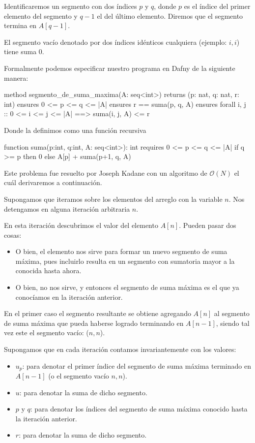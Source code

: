 \documentclass[12pt, a4paper, openany, fleqn]{book}
\begin{document}
    Identificaremos un segmento con dos índices $p$ y $q$, donde $p$ es el índice del primer elemento del segmento y $q-1$ el del último elemento. Diremos que el segmento termina en $A[q-1]$.

    El segmento vacío denotado por dos índices idénticos cualquiera (ejemplo: $i,i$) tiene suma 0.

    Formalmente podemos especificar nuestro programa en Dafny de la siguiente manera:

    \begin{dafny}
    method segmento_de_suma_maxima(A: seq<int>)
        returns (p: nat, q: nat, r: int)
        ensures 0 <= p <= q <= |A|
        ensures r == suma(p, q, A)
        ensures forall i, j :: 0 <= i <= j <= |A| ==> suma(i, j, A) <= r
    {
    }
    \end{dafny}

    Donde  la definimos como una función recursiva

    \begin{dafny}
    function suma(p:int, q:int, A: seq<int>): int
        requires 0 <= p <= q <= |A|
    {
        if q >= p then 0 else A[p] + suma(p+1, q, A)
    }
    \end{dafny}

    Este problema fue resuelto por Joseph Kadane con un algoritmo de $\mathcal{O}(N)$ el cuál derivaremos a continuación.

    Supongamos que iteramos sobre los elementos del arreglo con la variable $n$. Nos detengamos en alguna iteración arbitraria $n$.

    En esta iteración descubrimos el valor del elemento $A[n]$. Pueden pasar dos cosas:
    \begin{itemize}
        \item O bien, el elemento nos sirve para formar un nuevo segmento de suma máxima, pues incluirlo resulta en un segmento con sumatoria mayor a la conocida hasta ahora.
        \item O bien, no nos sirve, y entonces el segmento de suma máxima es el que ya conocíamos en la iteración anterior.
    \end{itemize}

    En el primer caso el segmento resultante se obtiene agregando $A[n]$ al segmento de suma máxima que pueda haberse logrado terminando en $A[n-1]$, siendo tal vez este el segmento vacío: ($n,n$).

    Supongamos que en cada iteración contamos invariantemente con los valores:
    \begin{itemize}
        \item $u_p$: para denotar el primer índice del segmento de suma máxima terminado en $A[n - 1]$ (o el segmento vacío $n,n$).
        \item $u$: para denotar la suma de dicho segmento.
        \item $p$ y $q$: para denotar los índices del segmento de suma máxima conocido hasta la iteración anterior.
        \item $r$: para denotar la suma de dicho segmento.
    \end{itemize}
\end{document}
